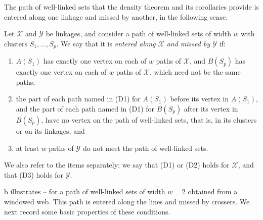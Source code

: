 \documentclass[fontsize=12pt,leading=14pt]{fullpaper}
\newcommand{\Xcal}{\mathcal{X}}
\newcommand{\Ycal}{\mathcal{Y}}
\begin{document}
The path of well-linked sets that the density theorem and its corollaries provide is entered along one linkage and missed by another, in the following sense.

\begin{definition}\label{def:entered}
  Let $\Xcal$ and $\Ycal$ be linkages, and consider a path of well-linked sets of width $w$ with clusters $S_1,\dots,S_p$.
  We say that it is \emph{entered along $\Xcal$ and missed by $\Ycal$} if:
  \begin{enumerate}[label=\textnormal{(D\arabic*)}]
    \item\label{item:dense-D1} $A(S_1)$ has exactly one vertex on each of $w$ paths of $\Xcal$, and $B(S_p)$ has exactly one vertex on each of $w$ paths of $\Xcal$, which need not be the same paths;
    \item\label{item:dense-D2} the part of each path named in (D1) for $A(S_1)$ before its vertex in $A(S_1)$, and the part of each path named in (D1) for $B(S_p)$ after its vertex in $B(S_p)$, have no vertex on the path of well-linked sets, that is, in its clusters or on its linkages; and
    \item\label{item:dense-D3} at least $w$ paths of $\Ycal$ do not meet the path of well-linked sets.
  \end{enumerate}
  We also refer to the items separately: we say that (D1) or (D2) holds for $\Xcal$, and that (D3) holds for $\Ycal$.
\end{definition}

b illustrates -- for a path of well-linked sets of width $w=2$ obtained from a windowed web.
This path is entered along the lines and missed by crossers.
We next record some basic properties of these conditions.
\end{document}
